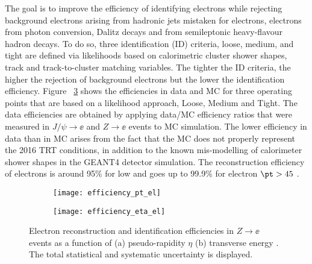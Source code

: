 The goal is to improve the efficiency of identifying electrons while rejecting background electrons arising from hadronic jets mistaken for electrons, 
electrons from photon conversion, Dalitz decays and from semileptonic heavy-flavour hadron decays.
To do so, three identification (ID) criteria, loose, medium, and tight are defined via likelihoods based on calorimetric cluster shower shapes, 
track and track-to-cluster matching variables.
The tighter the ID criteria, the higher the rejection of background electrons but the lower the identification efficiency.
Figure ~\ref{fig:exp.reco.eff.el} shows the  efficiencies in data and MC for three operating points that are based on a likelihood approach, Loose, Medium and Tight. 
The data efficiencies are obtained by applying data/MC efficiency ratios that were measured in  $J/\psi\to\ee$ and $Z\to\ee$ events to MC simulation. 
The lower efficiency in data than in MC arises from the fact that the MC does not properly represent the 2016 TRT conditions, 
in addition to the known mis-modelling of calorimeter shower shapes in the GEANT4 detector simulation.
The reconstruction efficiency of electrons is around 95\% for low \pt and goes up to 99.9\% for electron $\pt > 45$ \GeV.


\begin{figure}[htb!]
\centering
\begin{subfigure}[t]{0.49\textwidth}
\texttt{[image: efficiency\_pt\_el]}
\subcaption{}
\label{fig:exp.reco.eff_pt}
\end{subfigure}
\begin{subfigure}[t]{0.49\textwidth}
\texttt{[image: efficiency\_eta\_el]}
\subcaption{}
\label{fig:exp.reco.eff_eta}
\end{subfigure}
\vspace{-0.25cm}
\caption{
Electron reconstruction and identification efficiencies in $Z\to\ee$ events as a function of (a) pseudo-rapidity $\eta$ (b) transverse energy \et.
The total statistical and systematic uncertainty is displayed. 
}
\label{fig:exp.reco.eff.el}
\end{figure} 



